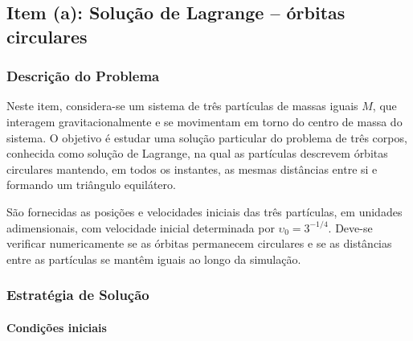 \documentclass[12pt,a4paper]{article}
\begin{document}
\subsection{Item (a): Solução de Lagrange -- órbitas circulares}

\subsubsection{Descrição do Problema}

Neste item, considera-se um sistema de três partículas de massas iguais $M$, que interagem gravitacionalmente e se movimentam em torno do centro de massa do sistema. O objetivo é estudar uma solução particular do problema de três corpos, conhecida como solução de Lagrange, na qual as partículas descrevem órbitas circulares mantendo, em todos os instantes, as mesmas distâncias entre si e formando um triângulo equilátero.

São fornecidas as posições e velocidades iniciais das três partículas, em unidades adimensionais, com velocidade inicial determinada por $\upsilon_0=3^{-1/4}$. Deve-se verificar numericamente se as órbitas permanecem circulares e se as distâncias entre as partículas se mantêm iguais ao longo da simulação.


\subsubsection{Estratégia de Solução}

\paragraph{Condições iniciais}
\end{document}

